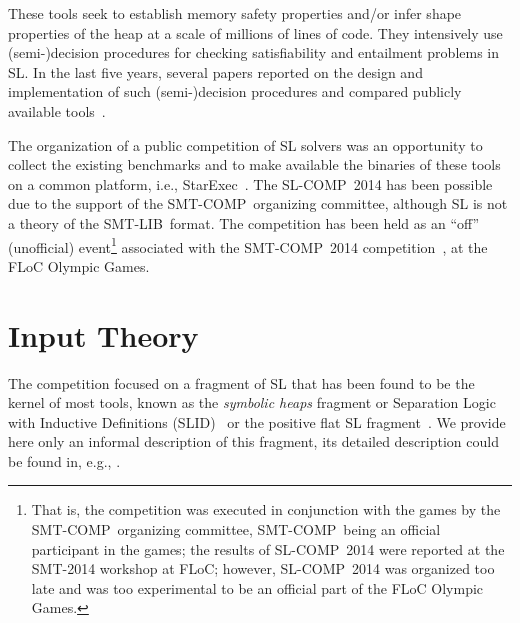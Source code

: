 \documentclass[twoside,11pt]{article}
\newcommand{\SLRD}{\textsc{SLID}}
\newcommand{\smtlib}{\textsf{SMT-LIB}}
\newcommand{\smtcomp}{\textsf{SMT-COMP}}
\newcommand{\slcomp}{\textsf{SL-COMP}}
\newcommand{\starexec}{\textsf{StarExec}}
\begin{document}
These tools seek to establish memory safety properties and/or infer shape properties of the heap at a scale of millions of lines of code.
They intensively use (semi-)decision procedures for checking satisfiability and entailment problems in SL.
In the last five years, several papers reported on the design and implementation of such (semi-)decision procedures and compared publicly available tools~\cite{HasseIOP13}.

The organization of a public competition of SL solvers was an opportunity 
to collect the existing benchmarks and  
to make available the binaries of these tools on a common platform, i.e., \starexec~\cite{StarExecsite}.
The \slcomp\ 2014 has been possible due to the support of the \smtcomp\ organizing committee, 
although SL is not a theory of the \smtlib\ format.
The competition has been held as an ``off'' (unofficial) event\footnote{That is, the competition was executed in conjunction with the games by the \smtcomp\ organizing committee, \smtcomp\ being an official participant in the games; the results of \slcomp\ 2014 were reported at the SMT-2014 workshop at FLoC; however, \slcomp\ 2014 was organized too late and was too experimental to be an official part of the FLoC Olympic Games.}
associated with the \smtcomp\ 2014 competition~\cite{SMTCOMPsite}, at the FLoC Olympic Games.


\section{Input Theory}
\label{sec:SL}

The competition focused on a fragment of SL that has been found to be the kernel of most tools, known 
as
the \emph{symbolic heaps} fragment
or Separation Logic with Inductive Definitions (\SLRD)~\cite{IosifRS13} or
the positive flat SL fragment~\cite{AntonopoulosGHKO14}. 
We provide here only an informal description of this fragment, its detailed description could be found in, e.g., \cite{Reynolds02,IosifRS13,AntonopoulosGHKO14}.  
\end{document}
